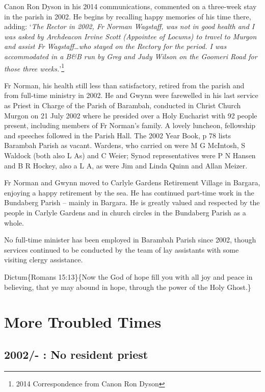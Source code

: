 Canon Ron Dyson in his 2014 communications, commented on a three-week stay in the parish in 2002. He begins by recalling happy memories of his time there, adding: `\emph{The Rector in 2002, Fr Norman Wagstaff, was not in good health and I was asked by Archdeacon Irvine Scott (Appointee of Locums) to travel to Murgon and assist Fr Wagstaff\ldots who stayed on the Rectory for the period. I was accommodated in a B\&B run by Greg and Judy Wilson on the Goomeri Road for those three weeks.}'\footnote{2014 Correspondence from Canon Ron Dyson}

Fr Norman, his health still less than satisfactory, retired from the parish and from full-time ministry in 2002. He and Gwynn were farewelled in his last service as Priest in Charge of the Parish of Barambah, conducted in Christ Church Murgon on 21 July 2002 where he presided over a Holy Eucharist with 92 people present, including members of Fr Norman's family. A lovely luncheon, fellowship and speeches followed in the Parish Hall. The 2002 Year Book, p 78 lists Barambah Parish as vacant. Wardens, who carried on were M G McIntosh, S Waldock (both also L As) and C Weier; Synod representatives were P N Hansen and B R Hockey, also a L A, as were Jim and Linda Quinn and Allan Meizer.

Fr Norman and Gwynn moved to Carlyle Gardens Retirement Village in Bargara, enjoying a happy retirement by the sea. He has continued part-time work in the Bundaberg Parish -- mainly in Bargara. He is greatly valued and respected by the people in Carlyle Gardens and in church circles in the Bundaberg Parish as a whole.

No full-time minister has been employed in Barambah Parish since 2002, though services continued to be conducted by the team of lay assistants with some visiting clergy assistance.

Dictum\{Romans 15:13\}\{Now the God of hope fill you with all joy and peace in believing, that ye may abound in hope, through the power of the Holy Ghost.\}

\hypertarget{more-troubled-times}{%
\chapter{More Troubled Times}\label{more-troubled-times}}

\hypertarget{no-resident-priest}{%
\section{2002/- : No resident priest}\label{no-resident-priest}}


